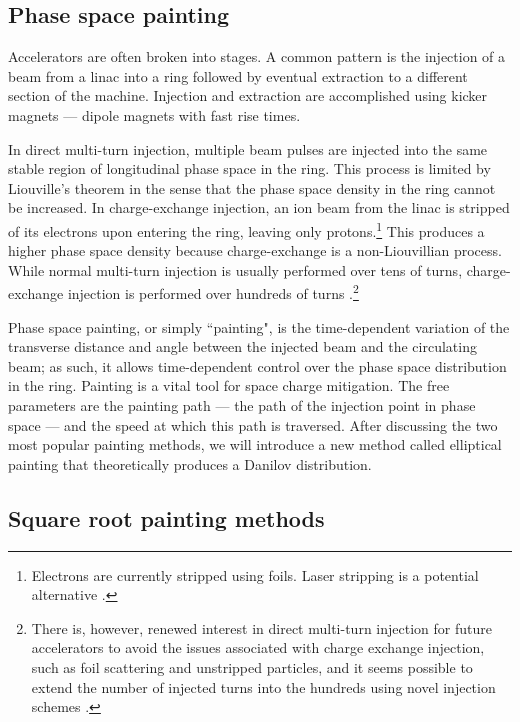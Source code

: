 \subsection{Phase space painting}

Accelerators are often broken into stages. A common pattern is the injection of a beam from a linac into a ring followed by eventual extraction to a different section of the machine. Injection and extraction are accomplished using kicker magnets — dipole magnets with fast rise times.

In direct multi-turn injection, multiple beam pulses are injected into the same stable region of longitudinal phase space in the ring. This process is limited by Liouville's theorem in the sense that the phase space density in the ring cannot be increased. In charge-exchange injection, an ion beam from the linac is stripped of its electrons upon entering the ring, leaving only protons.\footnote{Electrons are currently stripped using foils. Laser stripping is a potential alternative \cite{Cousineau2017}.} This produces a higher phase space density because charge-exchange is a non-Liouvillian process. While normal multi-turn injection is usually performed over tens of turns, charge-exchange injection is performed over hundreds of turns \cite{Bracco2017}.\footnote{There is, however, renewed interest in direct multi-turn injection for future accelerators to avoid the issues associated with charge exchange injection, such as foil scattering and unstripped particles, and it seems possible to extend the number of injected turns into the hundreds using novel injection schemes \cite{Prior2016}.} 

Phase space painting, or simply ``painting", is the time-dependent variation of the transverse distance and angle between the injected beam and the circulating beam; as such, it allows time-dependent control over the phase space distribution in the ring. Painting is a vital tool for space charge mitigation. The free parameters are the painting path — the path of the injection point in phase space — and the speed at which this path is traversed. After discussing the two most popular painting methods, we will introduce a new method called elliptical painting that theoretically produces a Danilov distribution.


\subsection{Square root painting methods}


